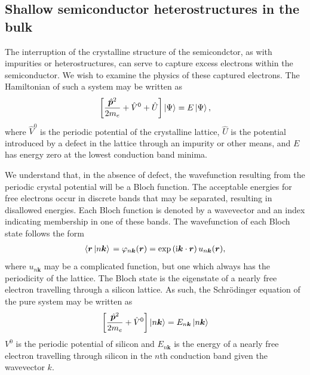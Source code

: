 


%

\subsection{Shallow semiconductor heterostructures in the bulk}
The interruption of the crystalline structure of the semicondctor, as
with impurities or heterostructures, can serve to capture excess
electrons within the semiconductor. We wish to examine the physics of
these captured electrons. The Hamiltonian of such a system may be
written as
\begin{equation}
\left[\frac{\hat{\bm{p}}^2}{2 m_e} + \hat{V}^0 +
  \hat{U}\right]\textstyle \left| \Psi \right\rangle \displaystyle = E\textstyle \left| \Psi \right\rangle \displaystyle,
\end{equation}
where $\hat{V}^0$ is the periodic potential of the crystalline
lattice, $\hat{U}$ is the potential introduced by a defect in the lattice
through an impurity or other means, and $E$ has energy zero at the
lowest conduction band minima.

We understand that, in the absence of defect, the wavefunction
resulting from the periodic crystal potential will be a Bloch
function. The acceptable energies for free electrons occur in discrete
bands that may be separated, resulting in disallowed energies. Each
Bloch function is denoted by a wavevector and an index indicating
membership in one of these bands. The wavefunction of each Bloch state
follows the form
\begin{gather}
\textstyle \left\langle \bm{r} \left| n\bm{k} \right\rangle\right. \displaystyle = \varphi_{n\bm{k}}(\bm{r}) = \exp\left(\mathrm{i}
\bm{k}\cdot\bm{r}\right)u_{n\bm{k}}(\bm{r}),
\end{gather}
where $u_{n\bm{k}}$ may be a complicated function, but one which
always has the periodicity of the lattice. The Bloch state is the
eigenstate of a nearly free electron travelling through a silicon
lattice. As such, the Schr\"{o}dinger equation of the pure system may
be written as
\begin{gather}
\left[\frac{\hat{\bm{p}}^2}{2 m_e} + \hat{V}^0\right]\textstyle \left| n\bm{k} \right\rangle \displaystyle
= E_{n\bm{k}}\textstyle \left| n\bm{k} \right\rangle \displaystyle
\end{gather}
$V^0$ is the periodic potential of silicon and $E_{n\bm{k}}$ is the energy
of a nearly free electron travelling through silicon in the $n$th
conduction band given the wavevector $k$.

